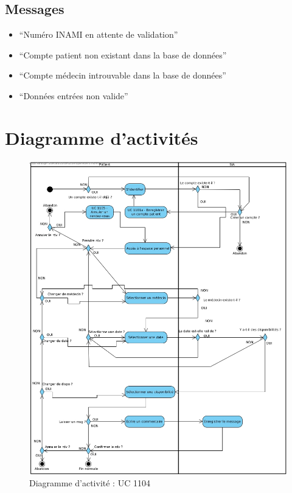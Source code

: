 \subsection{Messages}
\begin{itemize}
	\item ``Numéro INAMI en attente de validation''
	\item ``Compte patient non existant dans la base de données''
	\item ``Compte médecin introuvable dans la base de données''
	\item ``Données entrées non valide''
\end{itemize}
\newpage

\section{Diagramme d'activités}
\begin{figure}[hb]
	\centering
	\includegraphics[scale=0.4]{MCT/activiteUC1104.jpg}
	\caption{Diagramme d'activité : UC 1104}
	\label{fig:act1104}
\end{figure}
\newpage

